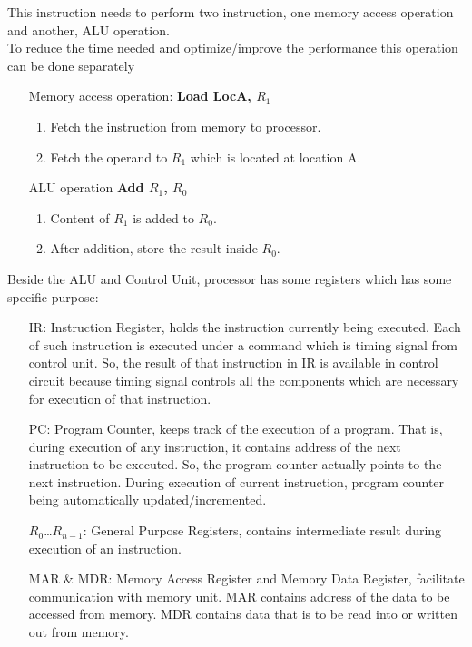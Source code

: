 \documentclass[12 pt, letterpaper]{extarticle}
\begin{document}
This instruction needs to perform two instruction, one memory access operation and another, ALU operation.\\
To reduce the time needed and optimize/improve the performance this operation can be done separately\\
\begin{enumerate}
	\item[Memory access operation:] \textbf{Load LocA, $R_1$}
		\begin{enumerate}
			\item Fetch the instruction from memory to processor.
			\item Fetch the operand to $R_1$ which is located at location A.
		\end{enumerate}
	\item[ALU operation] \textbf{Add $R_1$, $R_0$}
		\begin{enumerate}
			\item Content of $R_1$ is added to $R_0$.
			\item After addition, store the result inside $R_0$.
		\end{enumerate}
\end{enumerate}

Beside the ALU and Control Unit, processor has some registers which has some specific purpose:
\begin{itemize}
	\item[IR: ] Instruction Register, holds the instruction currently being executed. Each of such instruction is executed under a command which is timing signal from control unit. So, the result of that instruction in IR is available in control circuit because timing signal controls all the components which are necessary for execution of that instruction.
	\item[PC: ] Program Counter, keeps track of the execution of a program. That is, during execution of any instruction, it contains address of the next instruction to be executed. So, the program counter actually points to the next instruction. During execution of current instruction, program counter being automatically updated/incremented.
	\item[$R_0$\dots$R_{n-1}$:] General Purpose Registers, contains intermediate result during execution of an instruction.
	\item[MAR \& MDR:] Memory Access Register and Memory Data Register, facilitate communication with memory unit. MAR contains address of the data to be accessed from memory. MDR contains data that is to be read into or written out from memory.
\end{itemize}
\end{document}
